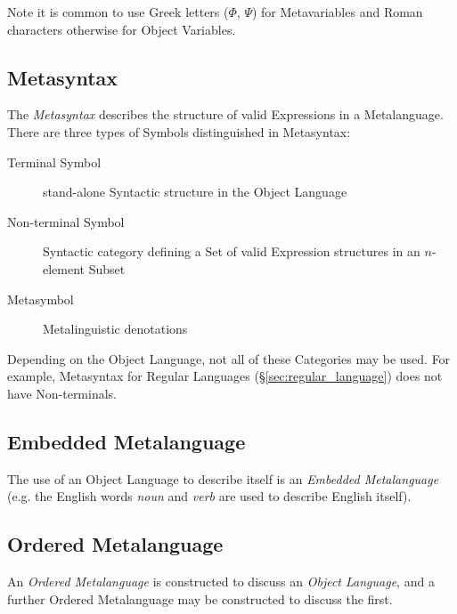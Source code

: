 Note it is common to use Greek letters ($\Phi$, $\Psi$) for
Metavariables and Roman characters otherwise for Object Variables.



\subsection{Metasyntax}\label{sec:metasyntax}

The \emph{Metasyntax} describes the structure of valid Expressions in
a Metalanguage. There are three types of Symbols distinguished in
Metasyntax:
\begin{description}
    \item [Terminal Symbol] stand-alone Syntactic structure in the
      Object Language
    \item [Non-terminal Symbol] Syntactic category defining a Set of
      valid Expression structures in an $n$-element Subset
    \item [Metasymbol] Metalinguistic denotations
\end{description}
Depending on the Object Language, not all of these Categories may be
used. For example, Metasyntax for Regular Languages
(\S\ref{sec:regular_language}) does not have Non-terminals.



\subsection{Embedded Metalanguage}\label{sec:embedded_metalanguage}

The use of an Object Language to describe itself is an \emph{Embedded
  Metalanguage} (e.g. the English words \emph{noun} and \emph{verb}
are used to describe English itself).



\subsection{Ordered Metalanguage}\label{sec:ordered_metalanguage}

An \emph{Ordered Metalanguage} is constructed to discuss an
\emph{Object Language}, and a further Ordered Metalanguage may be
constructed to discuss the first.


